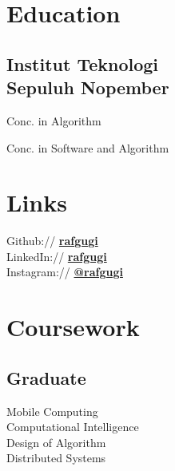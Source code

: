 \documentclass[letterpaper]{deedy-resume} %
\begin{document}
\begin{minipage}[t]{0.33\textwidth} %


\section{Education} 

\subsection[ITS]{Institut Teknologi\\Sepuluh Nopember}

Conc. in Algorithm \\
\sectionspace

Conc. in Software and Algorithm \\
\sectionspace


\section{Links} 

Github:// \href{https://github.com/rafgugi}{\bf rafgugi} \\
LinkedIn:// \href{https://www.linkedin.com/in/rafgugi}{\bf rafgugi} \\
Instagram:// \href{https://instagram.com/rafgugi}{\bf @rafgugi} \\
\sectionspace


\section{Coursework}

\subsection{Graduate}
Mobile Computing \\
Computational Intelligence \\
Design of Algorithm \\
Distributed Systems \\
\sectionspace


\end{minipage}
\end{document}
